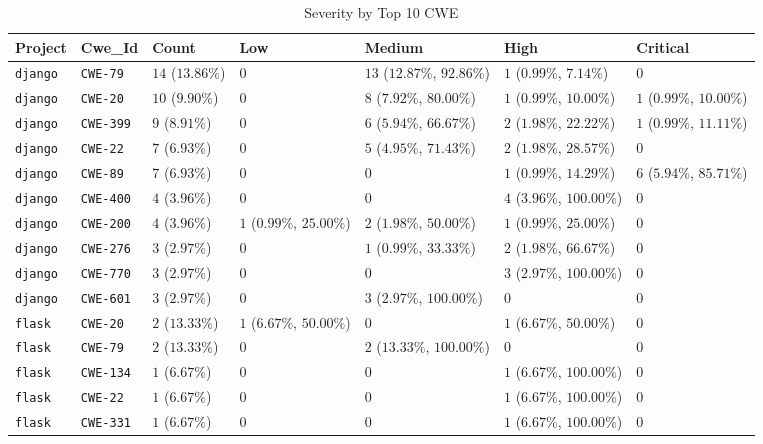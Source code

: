 \begin{table}
\caption{Severity by Top 10 CWE}
\label{tab:cwe-distribution}
\begin{tabular}{lllllll}
\toprule
Project & Cwe_Id & Count & Low & Medium & High & Critical \\
\midrule
\texttt{django} & \texttt{CWE-79} & $14$ ($13.86\%$) & $0$ & $13$ ($12.87\%$, $92.86\%$) & $1$ ($0.99\%$, $7.14\%$) & $0$ \\
\texttt{django} & \texttt{CWE-20} & $10$ ($9.90\%$) & $0$ & $8$ ($7.92\%$, $80.00\%$) & $1$ ($0.99\%$, $10.00\%$) & $1$ ($0.99\%$, $10.00\%$) \\
\texttt{django} & \texttt{CWE-399} & $9$ ($8.91\%$) & $0$ & $6$ ($5.94\%$, $66.67\%$) & $2$ ($1.98\%$, $22.22\%$) & $1$ ($0.99\%$, $11.11\%$) \\
\texttt{django} & \texttt{CWE-22} & $7$ ($6.93\%$) & $0$ & $5$ ($4.95\%$, $71.43\%$) & $2$ ($1.98\%$, $28.57\%$) & $0$ \\
\texttt{django} & \texttt{CWE-89} & $7$ ($6.93\%$) & $0$ & $0$ & $1$ ($0.99\%$, $14.29\%$) & $6$ ($5.94\%$, $85.71\%$) \\
\texttt{django} & \texttt{CWE-400} & $4$ ($3.96\%$) & $0$ & $0$ & $4$ ($3.96\%$, $100.00\%$) & $0$ \\
\texttt{django} & \texttt{CWE-200} & $4$ ($3.96\%$) & $1$ ($0.99\%$, $25.00\%$) & $2$ ($1.98\%$, $50.00\%$) & $1$ ($0.99\%$, $25.00\%$) & $0$ \\
\texttt{django} & \texttt{CWE-276} & $3$ ($2.97\%$) & $0$ & $1$ ($0.99\%$, $33.33\%$) & $2$ ($1.98\%$, $66.67\%$) & $0$ \\
\texttt{django} & \texttt{CWE-770} & $3$ ($2.97\%$) & $0$ & $0$ & $3$ ($2.97\%$, $100.00\%$) & $0$ \\
\texttt{django} & \texttt{CWE-601} & $3$ ($2.97\%$) & $0$ & $3$ ($2.97\%$, $100.00\%$) & $0$ & $0$ \\
\texttt{flask} & \texttt{CWE-20} & $2$ ($13.33\%$) & $1$ ($6.67\%$, $50.00\%$) & $0$ & $1$ ($6.67\%$, $50.00\%$) & $0$ \\
\texttt{flask} & \texttt{CWE-79} & $2$ ($13.33\%$) & $0$ & $2$ ($13.33\%$, $100.00\%$) & $0$ & $0$ \\
\texttt{flask} & \texttt{CWE-134} & $1$ ($6.67\%$) & $0$ & $0$ & $1$ ($6.67\%$, $100.00\%$) & $0$ \\
\texttt{flask} & \texttt{CWE-22} & $1$ ($6.67\%$) & $0$ & $0$ & $1$ ($6.67\%$, $100.00\%$) & $0$ \\
\texttt{flask} & \texttt{CWE-331} & $1$ ($6.67\%$) & $0$ & $0$ & $1$ ($6.67\%$, $100.00\%$) & $0$ \\

\end{tabular}
\end{table}
